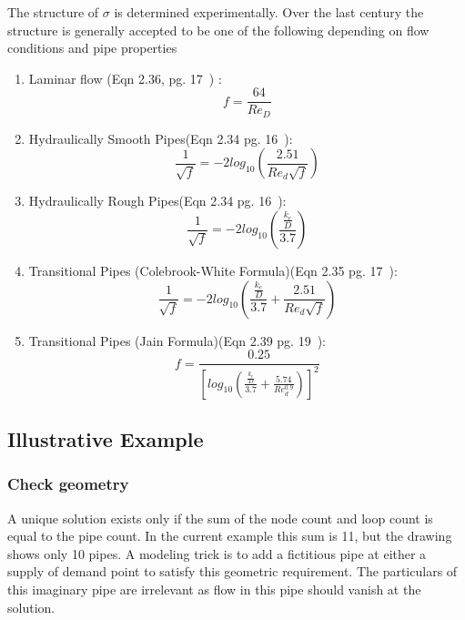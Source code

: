 The structure of $\sigma$ is determined experimentally.  Over the last century the structure is generally accepted to be one of the following depending on flow conditions and pipe properties
\begin{enumerate}
\item Laminar flow (Eqn 2.36, pg. 17~\cite{chin2006}) :  
\begin{equation}
f=\frac{64}{Re_D}
\label{eqn:friction-factor-laminar}
\end{equation}
\item Hydraulically Smooth Pipes(Eqn 2.34 pg. 16~\cite{chin2006}):
\begin{equation}
\frac{1}{\sqrt{f}}=-2 log_{10} (\frac{2.51}{Re_d \sqrt{f} })
\label{eqn:friction-factor-smooth}
\end{equation}
\item Hydraulically Rough Pipes(Eqn 2.34 pg. 16~\cite{chin2006}):
\begin{equation}
\frac{1}{\sqrt{f}}=-2 log_{10} (\frac{\frac{k_e}{D}} {3.7})
\label{eqn:friction-factor-rough}
\end{equation}
\item Transitional Pipes (Colebrook-White Formula)(Eqn 2.35 pg. 17~\cite{chin2006}):
\begin{equation}
\frac{1}{\sqrt{f}}=-2 log_{10} (\frac{\frac{k_e}{D}} {3.7} + \frac{2.51}{Re_d \sqrt{f} } )
\label{eqn:friction-factor-CW}
\end{equation}
\item Transitional Pipes (Jain Formula)(Eqn 2.39 pg. 19~\cite{chin2006}):
\begin{equation}
f=\frac{0.25}{[log_{10} (\frac{\frac{k_e}{D}} {3.7} + \frac{5.74}{Re_d^{0.9} } )]  ^2}
\label{eqn:friction-factor-Jain}
\end{equation}
\end{enumerate} 




\subsection{Illustrative Example}




\subsubsection{Check geometry}
A unique solution exists only if the sum of the node count and loop count is equal to the pipe count.  In the current example this sum is 11, but the drawing shows only 10 pipes.  A modeling trick is to add a fictitious pipe at either a supply of demand point to satisfy this geometric requirement.  The particulars of this imaginary pipe are irrelevant as flow in this pipe should vanish at the solution.


